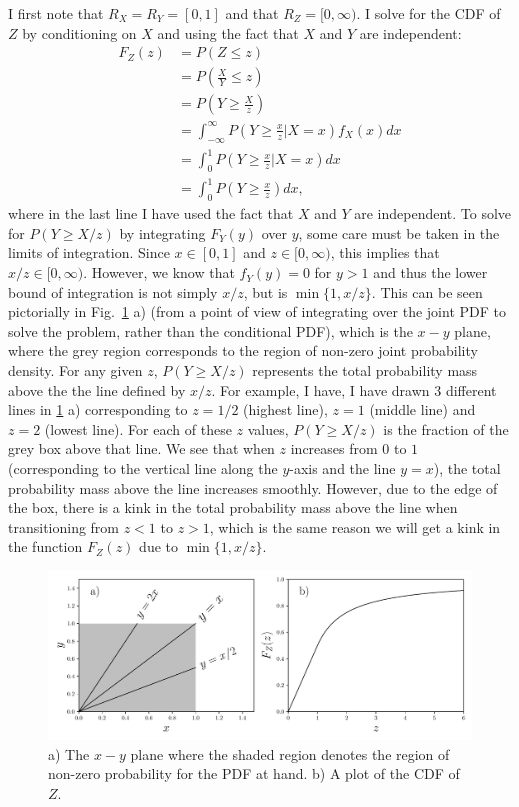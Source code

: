 \begin{problem}{27} I first note that $R_X=R_Y=[0, 1]$ and that $R_Z=[0, \infty)$.  I solve for the CDF of $Z$ by conditioning on $X$ and using the fact that $X$ and $Y$ are independent:
\begin{align*}
F_Z(z) &= P(Z \le z) \\
& = P\left(\frac{X}{Y} \le z\right) \\
& = P\left(Y \ge \frac{X}{z}\right) \\
& = \int_{-\infty}^\infty P \left(Y \ge \frac{x}{z} |X=x\right)f_X(x)dx \\
& = \int_{0}^1 P\left(Y \ge \frac{x}{z}|X=x\right)dx \\
& = \int_{0}^1 P\left(Y \ge \frac{x}{z}\right)dx,
\end{align*}
where in the last line I have used the fact that $X$ and $Y$ are independent.  To solve for $P(Y \ge X/z)$ by integrating $F_Y(y)$ over $y$, some care must be taken in the limits of integration.  Since $x \in [0, 1]$ and $z \in [0, \infty)$, this implies that $x/z \in [0, \infty)$.  However, we know that $f_Y(y) = 0$ for $y>1$ and thus the lower bound of integration is not simply $x/z$, but is $\min \{1, x/z \}$.  This can be seen pictorially in Fig.~\ref{fig:prob_27} a) (from a point of view of integrating over the joint PDF to solve the problem, rather than the conditional PDF), which is the $x-y$ plane, where the grey region corresponds to the region of non-zero joint probability density.  For any given $z$, $P(Y \ge X/z)$ represents the total probability mass above the the line defined by $x/z$.  For example, I have, I have drawn 3 different lines in \ref{fig:prob_27} a) corresponding to $z=1/2$ (highest line), $z=1$ (middle line) and $z=2$ (lowest line).  For each of these $z$ values, $P(Y \ge X/z)$ is the fraction of the grey box above that line.  We see that when $z$ increases from $0$ to $1$ (corresponding to the vertical  line along the $y$-axis and the line $y=x$), the total probability mass above the line increases smoothly.  However, due to the edge of the box, there is a kink in the total probability mass above the line when transitioning from $z<1$ to $z>1$, which is the same reason we will get a kink in the function $F_Z(z)$ due to $\min \{1, x/z \}$.  

	\begin{figure}[t]
	\centering
      		 \includegraphics[totalheight=6cm]{chpt5/prob27.pdf}
  			  \caption{a) The $x-y$ plane where the shaded region denotes the region of non-zero probability for the PDF at hand.  b) A plot of the CDF of $Z$.}
    			   \label{fig:prob_27}
	\end{figure}
	

\end{problem}

